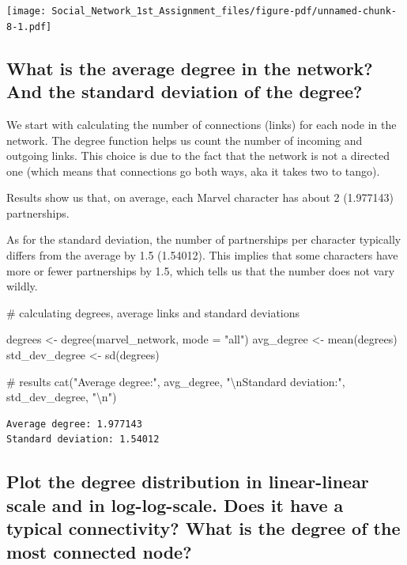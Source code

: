 \documentclass[
  letterpaper,
  DIV=11,
  numbers=noendperiod]{scrartcl}
\newenvironment{Shaded}{\begin{snugshade}}{\end{snugshade}}
\newcommand{\AttributeTok}[1]{\textcolor[rgb]{0.40,0.45,0.13}{#1}}
\newcommand{\CommentTok}[1]{\textcolor[rgb]{0.37,0.37,0.37}{#1}}
\newcommand{\FunctionTok}[1]{\textcolor[rgb]{0.28,0.35,0.67}{#1}}
\newcommand{\NormalTok}[1]{\textcolor[rgb]{0.00,0.23,0.31}{#1}}
\newcommand{\OtherTok}[1]{\textcolor[rgb]{0.00,0.23,0.31}{#1}}
\newcommand{\SpecialCharTok}[1]{\textcolor[rgb]{0.37,0.37,0.37}{#1}}
\newcommand{\StringTok}[1]{\textcolor[rgb]{0.13,0.47,0.30}{#1}}
\begin{document}
\texttt{[image: Social\_Network\_1st\_Assignment\_files/figure-pdf/unnamed-chunk-8-1.pdf]}

\subsection{What is the average degree in the network? And the standard
deviation of the
degree?}\label{what-is-the-average-degree-in-the-network-and-the-standard-deviation-of-the-degree}

We start with calculating the number of connections (links) for each
node in the network. The degree function helps us count the number of
incoming and outgoing links. This choice is due to the fact that the
network is not a directed one (which means that connections go both
ways, aka it takes two to tango).

Results show us that, on average, each Marvel character has about 2
(1.977143) partnerships.

As for the standard deviation, the number of partnerships per character
typically differs from the average by 1.5 (1.54012). This implies that
some characters have more or fewer partnerships by 1.5, which tells us
that the number does not vary wildly.

\begin{Shaded}
\begin{Highlighting}[]
\CommentTok{\# calculating degrees, average links and standard deviations}

\NormalTok{degrees }\OtherTok{\textless{}{-}} \FunctionTok{degree}\NormalTok{(marvel\_network, }\AttributeTok{mode =} \StringTok{"all"}\NormalTok{)}
\NormalTok{avg\_degree }\OtherTok{\textless{}{-}} \FunctionTok{mean}\NormalTok{(degrees)}
\NormalTok{std\_dev\_degree }\OtherTok{\textless{}{-}} \FunctionTok{sd}\NormalTok{(degrees)}

\CommentTok{\# results}
\FunctionTok{cat}\NormalTok{(}\StringTok{"Average degree:"}\NormalTok{, avg\_degree, }\StringTok{"}\SpecialCharTok{\textbackslash{}n}\StringTok{Standard deviation:"}\NormalTok{,}
\NormalTok{    std\_dev\_degree, }\StringTok{"}\SpecialCharTok{\textbackslash{}n}\StringTok{"}\NormalTok{)}
\end{Highlighting}
\end{Shaded}

\begin{verbatim}
Average degree: 1.977143 
Standard deviation: 1.54012 
\end{verbatim}

\subsection{Plot the degree distribution in linear-linear scale and in
log-log-scale. Does it have a typical connectivity? What is the degree
of the most connected
node?}\label{plot-the-degree-distribution-in-linear-linear-scale-and-in-log-log-scale.-does-it-have-a-typical-connectivity-what-is-the-degree-of-the-most-connected-node}
\end{document}
